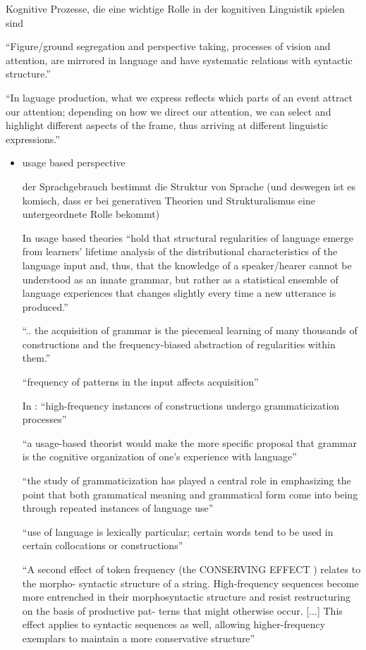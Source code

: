 Kognitive Prozesse, die eine wichtige Rolle in der kognitiven Linguistik spielen sind

\cite{Ellis08}
``Figure/ground segregation and perspective taking, processes of vision and attention, are mirrored in language and have systematic relations with syntactic structure.''

``In laguage production, what we express reflects which parts of an event attract our attention;
depending on how we direct our attention, we can select and highlight different aspects of the frame, thus arriving at different linguistic expressions.''


\begin{itemize}
    \item usage based perspective

        der Sprachgebrauch bestimmt die Struktur von Sprache (und deswegen ist es komisch, dass er bei generativen Theorien und Strukturalismus eine untergeordnete Rolle bekommt)

        In \cite{Ellis08} usage based theories ``hold that structural regularities of language emerge from learners' lifetime analysis of the distributional characteristics of the language input and, thus, that the knowledge of a speaker/hearer cannot be understood as an innate grammar, but rather as a statistical ensemble of language experiences that changes slightly every time a new utterance is produced.''

        ``.. the acquisition of grammar is the piecemeal learning of many thousands of constructions and the frequency-biased abstraction of regularities within them.''

        ``frequency of patterns in the input affects acquisition''

        In \cite{Bybee06}: ``high-frequency instances of constructions undergo grammaticization processes''

        ``a usage-based theorist would make the more specific proposal that grammar
        is the cognitive organization of one’s experience with language''

        ``the study of grammaticization has played a central role in emphasizing
        the point that both grammatical meaning and grammatical form come into being through
        repeated instances of language use''

        ``use of language is lexically particular;
        certain words tend to be used in certain collocations or constructions''

        ``A second effect of token frequency (the
        CONSERVING EFFECT
        ) relates to the morpho-
        syntactic structure of a string. High-frequency sequences become more entrenched in
        their morphosyntactic structure and resist restructuring on the basis of productive pat-
        terns that might otherwise occur.  [...]
        This effect applies to syntactic sequences as well, allowing
        higher-frequency exemplars to maintain a more conservative structure''


\end{itemize}
